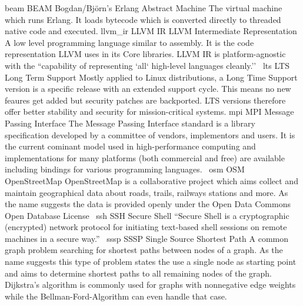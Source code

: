 \newdualentry
{beam}
{BEAM}
{Bogdan/Bj\"orn's Erlang Abstract Machine}
{The virtual machine which runs Erlang. It loads bytecode which is converted directly to threaded native code and executed.}
\newdualentry
{llvm_ir}
{LLVM IR}
{LLVM Intermediate Representation}
{A low level programming language similar to assembly. It is the code representation LLVM uses in its Core libraries. LLVM IR is platform-agnostic with the ``capability of representing `all` high-level languages cleanly.''~\cite{llvm_ir_ref}}
\newdualentry
{lts}
{LTS}
{Long Term Support}
{Mostly applied to Linux distributions, a Long Time Support version is a specific release with an extended support cycle. This means no new feaures get added but security patches are backported. LTS versions therefore offer better stability and security for mission-critical systems.}
\newdualentry
{mpi}
{MPI}
{Message Passing Interface}
{The Message Passing Interface standard is a library specification developed by a committee of vendors, implementors and users. It is the current cominant model used in high-performance computing and implementations for many platforms (both commercial and free) are available including bindings for various programming languages.~\cite{mpi_main, mpi_infiniband}}
\newdualentry
{osm}
{OSM}
{OpenStreetMap}
{OpenStreetMap is a collaborative project which aims collect and maintain geographical data about roads, trails, railways stations and more. As the name suggests the data is provided openly under the Open Data Commons Open Database License~}
\newdualentry
{ssh}
{SSH}
{Secure Shell}
{``Secure Shell is a cryptographic (encrypted) network protocol for initiating text-based shell sessions on remote machines in a secure way.''~\cite{wiki_ssh}}
\newdualentry
{sssp}
{SSSP}
{Single Source Shortest Path}
{A common graph problem searching for shortest paths between nodes of a graph. As the name suggests this type of problem states the use a single node as starting point and aims to determine shortest paths to all remaining nodes of the graph. Dijkstra's algorithm is commonly used for graphs with nonnegative edge weights while the Bellman-Ford-Algorithm can even handle that case.}
